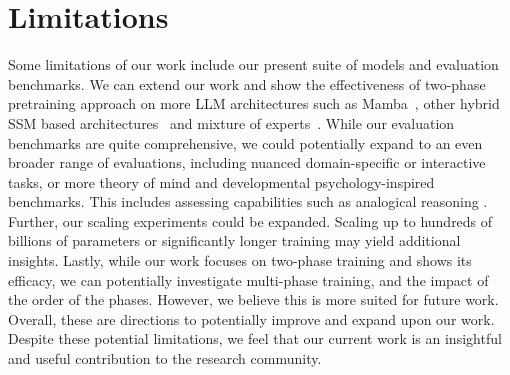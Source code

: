 \documentclass[11pt]{article}
\newcommand{\todo}[1]{{\color{red}\bf [TODO: #1]}\xspace}
\begin{document}

\section*{Limitations}


Some limitations of our work include our present suite of models and evaluation benchmarks. 
We can extend our work and show the effectiveness of two-phase pretraining approach on more LLM architectures such as Mamba~\cite{gu2023mamba}, other hybrid SSM based architectures~\cite{glorioso2024zamba,lieber2024jamba} and mixture of experts~\cite{shazeer2017outrageously}. %
While our evaluation benchmarks are quite comprehensive, we could potentially expand to an even broader range of evaluations, including nuanced domain-specific or interactive tasks, or more theory of mind and developmental psychology-inspired benchmarks. 
This includes assessing capabilities such as analogical reasoning \cite{webb2023emergentanalogicalreasoninglarge}.
Further, our scaling experiments could be expanded. Scaling up to hundreds of billions of parameters or significantly longer training may yield additional insights. Lastly, while our work focuses on two-phase training and shows its efficacy, we can potentially investigate multi-phase training, and the impact of the order of the phases. However, we believe this is more suited for future work. Overall, these are directions to potentially improve and expand upon our work. 
Despite these potential limitations, we feel that our current work is an insightful and useful contribution to the research community.
\end{document}
